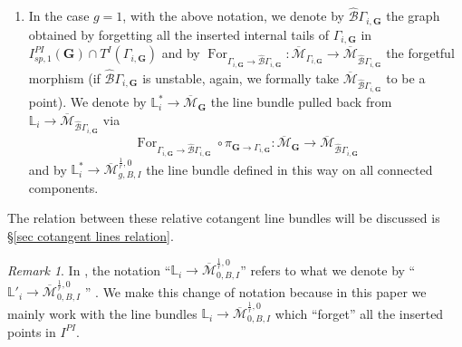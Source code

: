 \documentclass[11pt]{amsart}
\theoremstyle{definition}
\theoremstyle{remark}
\newtheorem{rmk}[dummy]{Remark}
\newcommand{\<}{\left<}
\renewcommand{\>}{\right>}
\numberwithin{equation}{section}
\def\Mbar{{\overline{\mathcal M}}}
\begin{document}
\begin{enumerate}
    \item 
    In the case $g=1$, with the above notation, we denote by $\hat{\mathcal B} \Gamma_{i,\bm{G}}$ the graph obtained by forgetting all the inserted internal tails of $\Gamma_{i,\bm{G}}$ in $I^{PI}_{sp,1}(\bm{G})\cap T^I(\Gamma_{i,\bm{G}})$ and by $\operatorname{For}_{\Gamma_{i,\bm{G}}\to \hat{\mathcal B} \Gamma_{i,\bm{G}}}\colon \Mbar_{\Gamma_{i,\bm{G}}}\to \Mbar_{\hat{\mathcal B} \Gamma_{i,\bm{G}}}$ the forgetful morphism (if $\hat{\mathcal B} \Gamma_{i,\bm{G}}$ is %
unstable, again, we formally %
take $\Mbar_{\hat{\mathcal B} \Gamma_{i,\bm{G}}}$ to be a point). We denote by $\mathbb L^*_i\to \Mbar_{\bm{G}}$ the line bundle pulled back from $\mathbb L_i\to \Mbar_{\hat{\mathcal B} \Gamma_{i,\bm{G}}}$ via 
    $$\operatorname{For}_{\Gamma_{i,\bm{G}}\to \hat{\mathcal B} \Gamma_{i,\bm{G}}}\circ \pi_{\bm{G}\to \Gamma_{i,\bm{G}}} \colon \Mbar_{\bm{G}} \to \Mbar_{\hat{\mathcal B} \Gamma_{i,\bm{G}}}$$ 
    and by $\mathbb L^*_i\to \Mbar^{\frac{1}{r},0}_{g,B,I}$ the line bundle defined in this way on all connected components.
    
    \end{enumerate}

 The relation between these relative cotangent line bundles will be discussed is \S \ref{sec cotangent lines relation}.

\begin{rmk}\label{rmk different notation for L in TZ}
    In \cite{TZ1,TZ2}, the notation ``$\mathbb L_i\to \Mbar^{\frac{1}{r},0}_{0,B,I}$'' refers to what we denote by ``$\mathbb L'_i\to \Mbar^{\frac{1}{r},0}_{0,B,I}$ %
'' . We %
make this change of notation because in this paper we mainly work with the line bundles $\mathbb L_i\to \Mbar^{\frac{1}{r},0}_{0,B,I}$ %
which ``forget'' all %
the inserted points in $I^{PI}$. 
\end{rmk}
\end{document}
